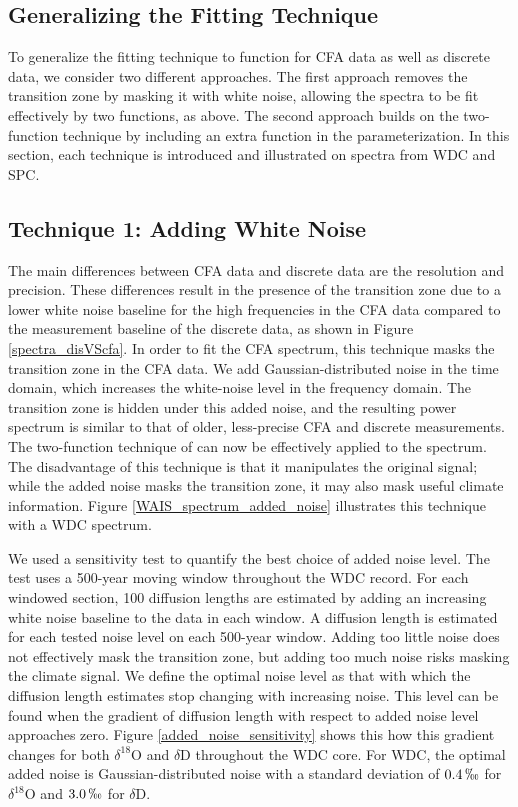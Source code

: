 \documentclass[draft, jgrga]{AGUTeX}
\begin{document}
\begin{article}
\section{Generalizing the Fitting Technique}
To generalize the fitting technique to function for CFA data as well as discrete data, we consider two different approaches. The first approach removes the transition zone by masking it with white noise, allowing the spectra to be fit effectively by two functions, as above. The second approach builds on the two-function technique by including an extra function in the parameterization. In this section, each technique is introduced and illustrated on spectra from WDC and SPC.

\subsection{Technique 1: Adding White Noise}
The main differences between CFA data and discrete data are the resolution and precision. These differences result in the presence of the transition zone due to a lower white noise baseline for the high frequencies in the CFA data compared to the measurement baseline of the discrete data, as shown in Figure \ref{spectra_disVScfa}. In order to fit the CFA spectrum, this technique masks the transition zone in the CFA data. We add Gaussian-distributed noise in the time domain, which increases the white-noise level in the frequency domain. The transition zone is hidden under this added noise, and the resulting power spectrum is similar to that of older, less-precise CFA and discrete measurements. The two-function technique of \citet{Gkinis2014} can now be effectively applied to the spectrum. The disadvantage of this technique is that it manipulates the original signal; while the added noise masks the transition zone, it may also mask useful climate information. Figure \ref{WAIS_spectrum_added_noise} illustrates this technique with a WDC spectrum.

We used a sensitivity test to quantify the best choice of added noise level. The test uses a 500-year moving window throughout the WDC record. For each windowed section, 100 diffusion lengths are estimated by adding an increasing white noise baseline to the data in each window. A diffusion length is estimated for each tested noise level on each 500-year window. Adding too little noise does not effectively mask the transition zone, but adding too much noise risks masking the climate signal. We define the optimal noise level as that with which the diffusion length estimates stop changing with increasing noise. This level can be found when the gradient of diffusion length with respect to added noise level approaches zero. Figure \ref{added_noise_sensitivity} shows this how this gradient changes for both $\delta^{18}$O and $\delta$D throughout the WDC core. For WDC, the optimal added noise is Gaussian-distributed noise with a standard deviation of $0.4 \, \permil$ for $\delta^{18}$O and $3.0 \,\permil$ for $\delta$D.


\end{article}
\end{document}
